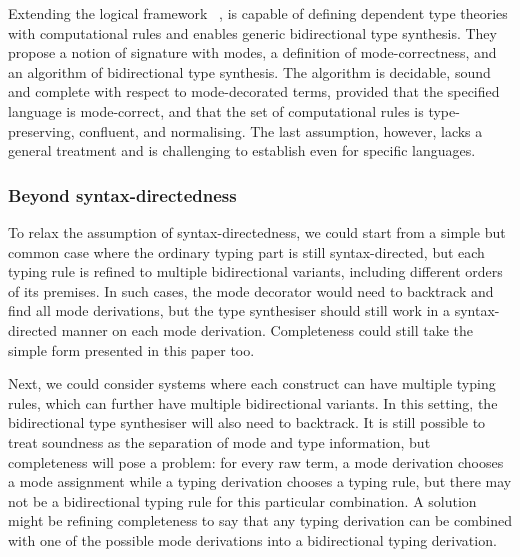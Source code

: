 Extending the logical framework \Dedukti~\cite{Assaf2016},  is capable of defining dependent type theories with computational rules and enables generic bidirectional type synthesis.
They propose a notion of \LF signature with modes, a definition of mode-correctness, and an algorithm of bidirectional type synthesis.
The algorithm is decidable, sound and complete with respect to mode-decorated terms, provided that the specified language is mode-correct, and that the set of computational rules is type-preserving, confluent, and normalising.
The last assumption, however, lacks a general treatment and is challenging to establish even for specific languages.

\subsubsection{Beyond syntax-directedness}


To relax the assumption of syntax-directedness, we could start from a simple but common case where the ordinary typing part is still syntax-directed, but each typing rule is refined to multiple bidirectional variants, including different orders of its premises.
In such cases, the mode decorator would need to backtrack and find all mode derivations, but the type synthesiser should still work in a syntax-directed manner on each mode derivation.
Completeness could still take the simple form presented in this paper too.

Next, we could consider systems where each construct can have multiple typing rules, which can further have multiple bidirectional variants.
In this setting, the bidirectional type synthesiser will also need to backtrack.
It is still possible to treat soundness as the separation of mode and type information, but completeness will pose a problem:
for every raw term, a mode derivation chooses a mode assignment while a typing derivation chooses a typing rule, but there may not be a bidirectional typing rule for this particular combination.
A solution might be refining completeness to say that any typing derivation can be combined with one of the possible mode derivations into a bidirectional typing derivation.


